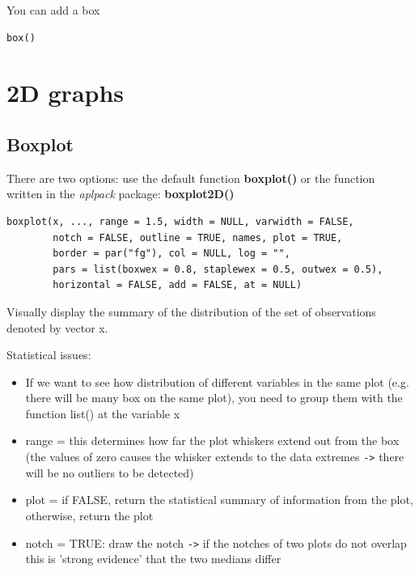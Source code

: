 You can add a box
\begin{lstlisting}
box()
\end{lstlisting}


\section{2D graphs}
\label{sec:2d-graphs}

\subsection{Boxplot}
\label{sec:boxplot}

There are two options: use the default function {\bf boxplot()} or the
function written in the {\it aplpack} package: {\bf boxplot2D()}

\begin{lstlisting}
boxplot(x, ..., range = 1.5, width = NULL, varwidth = FALSE,
        notch = FALSE, outline = TRUE, names, plot = TRUE,
        border = par("fg"), col = NULL, log = "",
        pars = list(boxwex = 0.8, staplewex = 0.5, outwex = 0.5),
        horizontal = FALSE, add = FALSE, at = NULL)
\end{lstlisting}
Visually display the summary of the distribution of the set of observations denoted by vector x.

Statistical issues:
\begin{itemize}
\item If we want to see how distribution of different variables in the
  same plot (e.g. there will be many box on the same plot), you need
  to group them with the function list() at the variable x 

\item range = this determines how far the plot whiskers extend out
  from the box (the values of zero causes the whisker extends to the
  data extremes \verb|->| there will be no outliers to be detected) 

\item plot = if FALSE, return the statistical summary of information
  from the plot, otherwise, return the plot 

\item notch = TRUE: draw the notch \verb|->| if the notches of two
  plots do not overlap this is 'strong evidence' that the two
  medians differ

\end{itemize}


